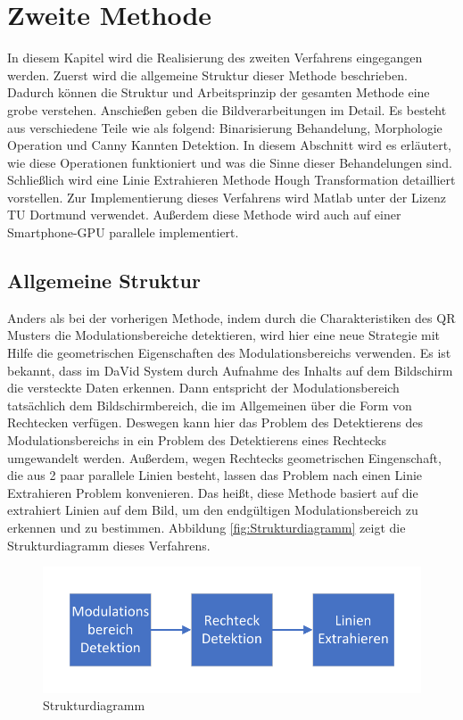\chapter{Zweite Methode} \label{cha:ZweiteMethode}

In diesem Kapitel wird die Realisierung des zweiten Verfahrens eingegangen werden. Zuerst wird die allgemeine Struktur dieser Methode beschrieben. Dadurch können die Struktur und Arbeitsprinzip der gesamten Methode eine grobe verstehen. Anschießen geben die Bildverarbeitungen im Detail. Es besteht aus verschiedene Teile wie als folgend: Binarisierung Behandelung, Morphologie Operation und Canny Kannten Detektion. In diesem Abschnitt wird es  erläutert, wie diese Operationen funktioniert und was die Sinne dieser Behandelungen sind. Schließlich wird eine Linie Extrahieren Methode Hough Transformation detailliert vorstellen. Zur Implementierung dieses Verfahrens wird Matlab unter der Lizenz TU Dortmund verwendet. Außerdem diese Methode wird auch auf einer Smartphone-GPU parallele implementiert.

\section{Allgemeine Struktur} 

Anders als bei der vorherigen Methode, indem durch die  Charakteristiken des QR Musters die Modulationsbereiche detektieren, wird hier eine neue Strategie mit Hilfe die geometrischen Eigenschaften des Modulationsbereichs verwenden. Es ist bekannt, dass im DaVid System durch Aufnahme des Inhalts auf dem Bildschirm die versteckte Daten erkennen. Dann entspricht der Modulationsbereich tatsächlich dem Bildschirmbereich, die im Allgemeinen über die Form von Rechtecken verfügen. Deswegen kann hier das Problem des Detektierens des Modulationsbereichs in ein Problem des Detektierens eines Rechtecks umgewandelt werden. Außerdem, wegen Rechtecks geometrischen Eingenschaft, die aus 2 paar parallele Linien besteht, lassen das Problem nach einen Linie Extrahieren Problem konvenieren. Das heißt, diese Methode basiert auf die extrahiert Linien auf dem Bild, um den endgültigen Modulationsbereich zu erkennen und zu bestimmen. Abbildung \ref{fig:Strukturdiagramm} zeigt die Strukturdiagramm dieses Verfahrens.

\begin{figure}[H]
 \centering 
 \includegraphics[keepaspectratio,width=1.0\textwidth]{images/4_ZweiteErfahrung/Strukturdiagramm.pdf}
 \caption{Strukturdiagramm}
 \label{fig:Strukturdiagramm für zweite Methode}
\end{figure}


